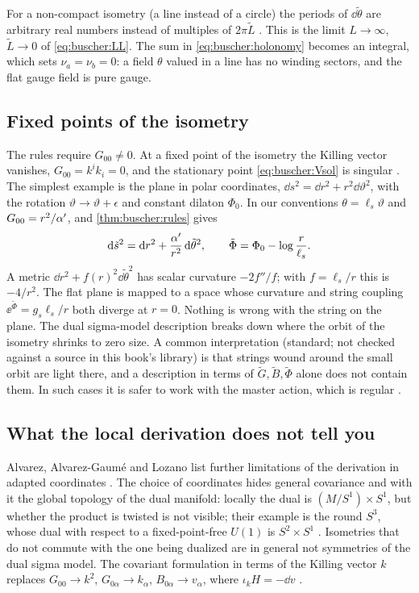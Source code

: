 For a non-compact isometry (a line instead of a circle) the periods of $\dd\tilde\theta$ are
arbitrary real numbers instead of multiples of $2\pi\tilde L$ . This is the limit $L\to\infty$, $\tilde L\to0$ of \eqref{eq:buscher:LL}. The sum
in \eqref{eq:buscher:holonomy} becomes an integral, which sets $\nu_a=\nu_b=0$: a field
$\theta$ valued in a line has no winding sectors, and the flat gauge field is pure gauge.

\subsection{Fixed points of the isometry}\label{sec:buscher:fixed}

The rules require $G_{00}\neq0$. At a fixed point of the isometry the Killing vector vanishes,
$G_{00}=k^ik_i=0$, and the stationary point \eqref{eq:buscher:Vsol} is singular
. The simplest example is the plane in polar coordinates,
$\dd s^2=\dd r^2+r^2\dd\vartheta^2$, with the rotation $\vartheta\to\vartheta+\epsilon$ and
constant dilaton $\Phi_0$. In our conventions $\theta=\ell_s\vartheta$ and $G_{00}=r^2/\alpha'$,
and \cref{thm:buscher:rules} gives
\begin{equation}\label{eq:buscher:plane}
 \mathrm{d}\tilde s^2=\mathrm{d} r^2+\frac{\alpha'}{r^2}\,\mathrm{d}\tilde\theta^2,\qquad
 \tilde\Phi=\Phi_0-\log\frac{r}{\ell_s}.
\end{equation}
A metric $\dd r^2+f(r)^2\dd\tilde\theta^2$ has scalar curvature $-2f''/f$; with
$f=\ell_s/r$ this is $-4/r^2$. The flat plane is mapped to a space whose curvature and
string coupling $\ee^{\tilde\Phi}=g_s\ell_s/r$ both diverge at $r=0$. Nothing is wrong with
the string on the plane. The dual sigma-model description breaks down where the orbit
of the isometry shrinks to zero size. A common interpretation (standard; not checked against
a source in this book's library) is that strings wound around the small orbit are light
there, and a description in terms of $\tilde G,\tilde B,\tilde\Phi$ alone does not contain
them. In such cases it is safer to work with the master action, which is regular
.

\subsection{What the local derivation does not tell you}
Alvarez, Alvarez-Gaum\'e and Lozano list further limitations of the derivation in adapted
coordinates . The choice of coordinates hides general covariance
and with it the global topology of the dual manifold: locally the dual is
$(M/S^1)\times S^1$, but whether the product is twisted is not visible; their example is the
round $S^3$, whose dual with respect to a fixed-point-free $U(1)$ is $S^2\times S^1$
. Isometries that do not commute with the one being dualized
are in general not symmetries of the dual sigma model. The covariant formulation in terms of
the Killing vector $k$ replaces $G_{00}\to k^2$, $G_{0\alpha}\to k_\alpha$,
$B_{0\alpha}\to v_\alpha$, where $\iota_kH=-\dd v$ .

